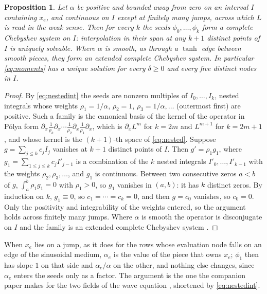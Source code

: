 \documentclass[11pt]{amsart}
\newtheorem{proposition}[theorem]{Proposition}
\theoremstyle{definition}
\theoremstyle{remark}
\newcommand{\px}{\partial_x}
\begin{document}
\begin{proposition}
\label{prop:ect}
Let $\alpha$ be positive and bounded away from zero on an interval $I$
containing $x_e$, and continuous on $I$ except at finitely many jumps,
across which $L$ is read in the weak sense. Then for every $k$ the seeds
$\phi_0, \ldots, \phi_k$ form a complete Chebyshev system on $I$:
interpolation in their span at any $k + 1$ distinct points of $I$ is
uniquely solvable. Where $\alpha$ is smooth, as through a $\tanh$ edge
between smooth pieces, they form an extended complete Chebyshev system. In
particular \eqref{eq:moments} has a unique solution for every
$\delta \ge 0$ and every five distinct nodes in $I$.
\end{proposition}

\begin{proof}
By \eqref{eq:nestedint} the seeds are nonzero multiples of $I_0, \ldots,
I_k$, nested integrals whose weights $\rho_1 = 1/\alpha$, $\rho_2 = 1$,
$\rho_3 = 1/\alpha, \ldots$ (outermost first) are positive. Such a family is
the canonical basis of the kernel of the operator in P\'olya form
$\px \frac{1}{\rho_k} \px \cdots \frac{1}{\rho_2} \px \frac{1}{\rho_1} \px$, which is
$\px L^m$ for $k = 2m$ and $L^{m+1}$ for $k = 2m + 1$, and whose kernel
is the $(k + 1)$-th space of \eqref{eq:nested}. Suppose $g = \sum_{j \le k} c_j I_j$
vanishes at $k + 1$ distinct points of $I$. Then $g' = \rho_1 g_1$, where
$g_1 = \sum_{1 \le j \le k} c_j I'_{j-1}$ is a combination of the $k$
nested integrals $I'_0, \ldots, I'_{k-1}$ with the weights $\rho_2, \rho_3,
\ldots$, and $g_1$ is continuous. Between two consecutive zeros $a < b$ of
$g$, $\int_a^b \rho_1 g_1 = 0$ with $\rho_1 > 0$, so $g_1$ vanishes in $(a, b)$:
it has $k$ distinct zeros. By induction on $k$, $g_1 \equiv 0$, so
$c_1 = \cdots = c_k = 0$, and then $g = c_0$ vanishes, so $c_0 = 0$. Only
the positivity and integrability of the weights entered, so the argument
holds across finitely many jumps. Where $\alpha$ is smooth the operator is
disconjugate on $I$ and the family is an extended complete Chebyshev system
\cite{Polya1922,KarlinStudden1966,Coppel1971}.
\end{proof}

When $x_e$ lies on a jump, as it does for the rows whose evaluation node
falls on an edge of the sinusoidal medium, $\alpha_e$ is the value of the
piece that owns $x_e$; $\phi_1$ then has slope $1$ on that side and
$\alpha_e / \alpha$ on the other, and nothing else changes, since
$\alpha_e$ enters the seeds only as a factor. The argument is the one the
companion paper makes for the two fields of the wave equation
\cite{Martin2026seeds}, shortened by \eqref{eq:nestedint}.
\end{document}
